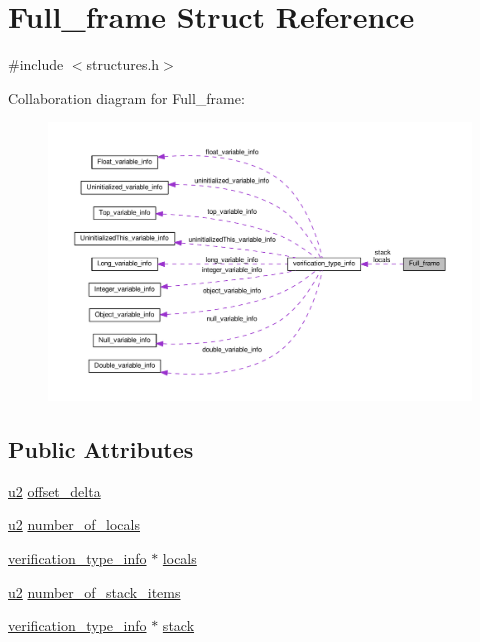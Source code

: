 \hypertarget{structFull__frame}{}\section{Full\+\_\+frame Struct Reference}
\label{structFull__frame}


{\ttfamily \#include $<$structures.\+h$>$}



Collaboration diagram for Full\+\_\+frame\+:
\nopagebreak
\begin{figure}[H]
\begin{center}
\leavevmode
\includegraphics[width=350pt]{structFull__frame__coll__graph}
\end{center}
\end{figure}
\subsection*{Public Attributes}
\begin{DoxyCompactItemize}
\item 
\hyperlink{structures_8h_a55ef8d87fd202b8417704c089899c5b9}{u2} \hyperlink{structFull__frame_a2f561b5115209c671be0395a95a53dd5}{offset\+\_\+delta}
\item 
\hyperlink{structures_8h_a55ef8d87fd202b8417704c089899c5b9}{u2} \hyperlink{structFull__frame_a71a6efd7eaea7f6eb0ad1de7c70b4245}{number\+\_\+of\+\_\+locals}
\item 
\hyperlink{structverification__type__info}{verification\+\_\+type\+\_\+info} $\ast$ \hyperlink{structFull__frame_a12b01bc78373d145cbae4553a7c9b6a5}{locals}
\item 
\hyperlink{structures_8h_a55ef8d87fd202b8417704c089899c5b9}{u2} \hyperlink{structFull__frame_a11b6e1548b1ca3c416abc3fa6c3d3935}{number\+\_\+of\+\_\+stack\+\_\+items}
\item 
\hyperlink{structverification__type__info}{verification\+\_\+type\+\_\+info} $\ast$ \hyperlink{structFull__frame_a40ff4ea967461300e1ce8dbb51e28fa0}{stack}
\end{DoxyCompactItemize}


